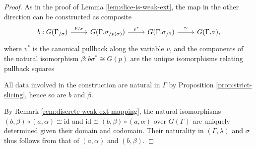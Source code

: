\documentclass[a4paper]{article}
\theoremstyle{remark}
\theoremstyle{definition}
\begin{document}
\begin{proof}
  As in the proof of Lemma \ref{lem:slice-is-weak-ext}, the map in the other direction can be constructed as composite
  \begin{equation}
    \begin{tikzcd}
      b : G(\Gamma_{/ \sigma}) \arrow[r, "p_{/ \sigma}"] & G(\Gamma.\sigma_{/ p(\sigma)}) \arrow[r, "v^*"] & G(\Gamma.\sigma_{/ 1}) \arrow[r, "\cong"] & G(\Gamma.\sigma),
    \end{tikzcd}
  \end{equation}
  where $v^*$ is the canonical pullback along the variable $v$, and the components of the natural isomorphism $\beta : b \sigma^* \cong G(p)$ are the unique isomorphisms relating pullback squares
  All data involved in the construction are natural in $\Gamma$ by Proposition \ref{prop:strict-slicing}, hence so are $b$ and $\beta$.

  By Remark \ref{rem:discrete-weak-ext-mapping}, the natural isomorphisms $(b, \beta) \circ (a, \alpha) \cong \mathrm{id}$ and $\mathrm{id} \cong (b, \beta) \circ (a, \alpha)$ over $G(\Gamma)$ are uniquely determined given their domain and codomain.
  Their naturality in $(\Gamma, \lambda)$ and $\sigma$ thus follows from that of $(a, \alpha)$ and $(b, \beta)$.
\end{proof}
\end{document}
